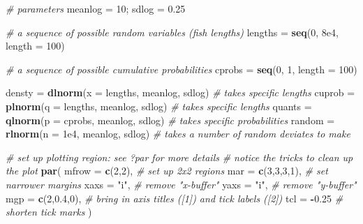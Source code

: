 \documentclass[]{book}
\newenvironment{Shaded}{\begin{snugshade}}{\end{snugshade}}
\newcommand{\KeywordTok}[1]{\textcolor[rgb]{0.13,0.29,0.53}{\textbf{#1}}}
\newcommand{\DataTypeTok}[1]{\textcolor[rgb]{0.13,0.29,0.53}{#1}}
\newcommand{\DecValTok}[1]{\textcolor[rgb]{0.00,0.00,0.81}{#1}}
\newcommand{\FloatTok}[1]{\textcolor[rgb]{0.00,0.00,0.81}{#1}}
\newcommand{\StringTok}[1]{\textcolor[rgb]{0.31,0.60,0.02}{#1}}
\newcommand{\CommentTok}[1]{\textcolor[rgb]{0.56,0.35,0.01}{\textit{#1}}}
\newcommand{\OperatorTok}[1]{\textcolor[rgb]{0.81,0.36,0.00}{\textbf{#1}}}
\newcommand{\NormalTok}[1]{#1}
\theoremstyle{definition}
\theoremstyle{definition}
\theoremstyle{definition}
\theoremstyle{remark}
\begin{document}
\begin{Shaded}
\begin{Highlighting}[]
\CommentTok{# parameters}
\NormalTok{meanlog =}\StringTok{ }\DecValTok{10}\NormalTok{; sdlog =}\StringTok{ }\FloatTok{0.25}

\CommentTok{# a sequence of possible random variables (fish lengths)}
\NormalTok{lengths =}\StringTok{ }\KeywordTok{seq}\NormalTok{(}\DecValTok{0}\NormalTok{, }\FloatTok{8e4}\NormalTok{, }\DataTypeTok{length =} \DecValTok{100}\NormalTok{)}

\CommentTok{# a sequence of possible cumulative probabilities}
\NormalTok{cprobs =}\StringTok{ }\KeywordTok{seq}\NormalTok{(}\DecValTok{0}\NormalTok{, }\DecValTok{1}\NormalTok{, }\DataTypeTok{length =} \DecValTok{100}\NormalTok{)}

\NormalTok{densty =}\StringTok{ }\KeywordTok{dlnorm}\NormalTok{(}\DataTypeTok{x =}\NormalTok{ lengths, meanlog, sdlog)  }\CommentTok{# takes specific lengths}
\NormalTok{cuprob =}\StringTok{ }\KeywordTok{plnorm}\NormalTok{(}\DataTypeTok{q =}\NormalTok{ lengths, meanlog, sdlog)  }\CommentTok{# takes specific lengths}
\NormalTok{quants =}\StringTok{ }\KeywordTok{qlnorm}\NormalTok{(}\DataTypeTok{p =}\NormalTok{ cprobs, meanlog, sdlog)   }\CommentTok{# takes specific probabilities}
\NormalTok{random =}\StringTok{ }\KeywordTok{rlnorm}\NormalTok{(}\DataTypeTok{n =} \FloatTok{1e4}\NormalTok{, meanlog, sdlog)      }\CommentTok{# takes a number of random deviates to make}

\CommentTok{# set up plotting region: see ?par for more details}
\CommentTok{# notice the tricks to clean up the plot}
\KeywordTok{par}\NormalTok{(}
  \DataTypeTok{mfrow =} \KeywordTok{c}\NormalTok{(}\DecValTok{2}\NormalTok{,}\DecValTok{2}\NormalTok{),    }\CommentTok{# set up 2x2 regions}
  \DataTypeTok{mar =} \KeywordTok{c}\NormalTok{(}\DecValTok{3}\NormalTok{,}\DecValTok{3}\NormalTok{,}\DecValTok{3}\NormalTok{,}\DecValTok{1}\NormalTok{),  }\CommentTok{# set narrower margins}
  \DataTypeTok{xaxs =} \StringTok{"i"}\NormalTok{,        }\CommentTok{# remove "x-buffer"}
  \DataTypeTok{yaxs =} \StringTok{"i"}\NormalTok{,        }\CommentTok{# remove "y-buffer"}
  \DataTypeTok{mgp =} \KeywordTok{c}\NormalTok{(}\DecValTok{2}\NormalTok{,}\FloatTok{0.4}\NormalTok{,}\DecValTok{0}\NormalTok{),  }\CommentTok{# bring in axis titles ([1]) and tick labels ([2])}
  \DataTypeTok{tcl =} \OperatorTok{-}\FloatTok{0.25}        \CommentTok{# shorten tick marks}
\NormalTok{)}


\end{Highlighting}
\end{Shaded}
\end{document}
